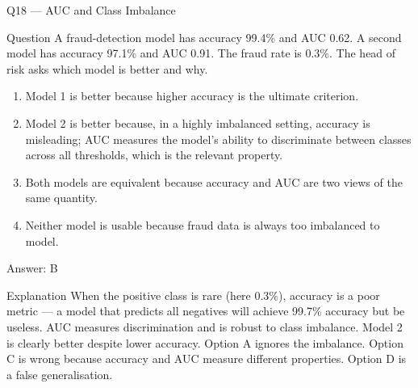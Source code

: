 \documentclass[aspectratio=169,8pt]{beamer}
\begin{document}
	\begin{frame}{Q18 --- AUC and Class Imbalance}
		\begin{block}{Question}
			A fraud-detection model has accuracy 99.4\% and AUC 0.62. A second model has accuracy 97.1\% and AUC 0.91. The fraud rate is 0.3\%. The head of risk asks which model is better and why.
		\end{block}
		\begin{enumerate}
			\item Model 1 is better because higher accuracy is the ultimate criterion.
			\item Model 2 is better because, in a highly imbalanced setting, accuracy is misleading; AUC measures the model's ability to discriminate between classes across all thresholds, which is the relevant property.
			\item Both models are equivalent because accuracy and AUC are two views of the same quantity.
			\item Neither model is usable because fraud data is always too imbalanced to model.
		\end{enumerate}
		\begin{exampleblock}{Answer: B}\end{exampleblock}
		\begin{block}{Explanation}
			When the positive class is rare (here 0.3\%), accuracy is a poor metric --- a model that predicts all negatives will achieve 99.7\% accuracy but be useless. AUC measures discrimination and is robust to class imbalance. Model 2 is clearly better despite lower accuracy. Option A ignores the imbalance. Option C is wrong because accuracy and AUC measure different properties. Option D is a false generalisation.
		\end{block}
	\end{frame}
	
\end{document}
